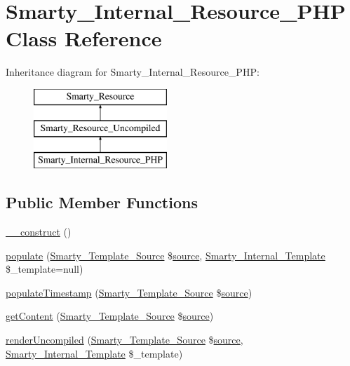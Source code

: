 \hypertarget{class_smarty___internal___resource___p_h_p}{}\section{Smarty\+\_\+\+Internal\+\_\+\+Resource\+\_\+\+P\+H\+P Class Reference}
\label{class_smarty___internal___resource___p_h_p}
Inheritance diagram for Smarty\+\_\+\+Internal\+\_\+\+Resource\+\_\+\+P\+H\+P\+:\begin{figure}[H]
\begin{center}
\leavevmode
\includegraphics[height=3.000000cm]{class_smarty___internal___resource___p_h_p}
\end{center}
\end{figure}
\subsection*{Public Member Functions}
\begin{DoxyCompactItemize}
\item 
\hyperlink{class_smarty___internal___resource___p_h_p_a095c5d389db211932136b53f25f39685}{\+\_\+\+\_\+construct} ()
\item 
\hyperlink{class_smarty___internal___resource___p_h_p_a07a771f460d625d63fcb72d0aeed0b01}{populate} (\hyperlink{class_smarty___template___source}{Smarty\+\_\+\+Template\+\_\+\+Source} \$\hyperlink{class_smarty___resource_ab6ac6b66dac2da6c41a178102f7d53e4}{source}, \hyperlink{class_smarty___internal___template}{Smarty\+\_\+\+Internal\+\_\+\+Template} \$\+\_\+template=null)
\item 
\hyperlink{class_smarty___internal___resource___p_h_p_a0935298de0f84d80fdb2ec7c9c52a763}{populate\+Timestamp} (\hyperlink{class_smarty___template___source}{Smarty\+\_\+\+Template\+\_\+\+Source} \$\hyperlink{class_smarty___resource_ab6ac6b66dac2da6c41a178102f7d53e4}{source})
\item 
\hyperlink{class_smarty___internal___resource___p_h_p_a0e40116a3d4f59cf7ea39f83441169b8}{get\+Content} (\hyperlink{class_smarty___template___source}{Smarty\+\_\+\+Template\+\_\+\+Source} \$\hyperlink{class_smarty___resource_ab6ac6b66dac2da6c41a178102f7d53e4}{source})
\item 
\hyperlink{class_smarty___internal___resource___p_h_p_ae2d36f1295b1850aab7d985e92bafb15}{render\+Uncompiled} (\hyperlink{class_smarty___template___source}{Smarty\+\_\+\+Template\+\_\+\+Source} \$\hyperlink{class_smarty___resource_ab6ac6b66dac2da6c41a178102f7d53e4}{source}, \hyperlink{class_smarty___internal___template}{Smarty\+\_\+\+Internal\+\_\+\+Template} \$\+\_\+template)
\end{DoxyCompactItemize}

